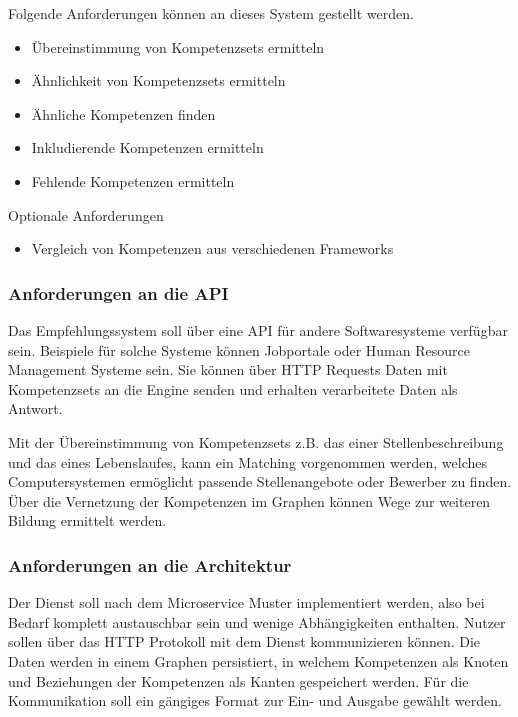 Folgende Anforderungen können an dieses System gestellt werden.
\begin{itemize}
	\item Übereinstimmung von Kompetenzsets ermitteln
	\item Ähnlichkeit von Kompetenzsets ermitteln
	\item Ähnliche Kompetenzen finden
	\item Inkludierende Kompetenzen ermitteln
	\item Fehlende Kompetenzen ermitteln
\end{itemize}

\vspace{1em}

Optionale Anforderungen

\begin{itemize}
	\item Vergleich von Kompetenzen aus verschiedenen Frameworks
\end{itemize}

\subsubsection{Anforderungen an die API}

Das Empfehlungssystem soll über eine API für andere Softwaresysteme verfügbar sein. Beispiele für solche Systeme können Jobportale oder Human Resource Management Systeme sein. Sie können über HTTP Requests Daten mit Kompetenzsets an die Engine senden und erhalten verarbeitete Daten als Antwort.

Mit der Übereinstimmung von Kompetenzsets z.B. das einer Stellenbeschreibung und das eines Lebenslaufes, kann ein Matching vorgenommen werden, welches Computersystemen ermöglicht passende Stellenangebote oder Bewerber zu finden. Über die Vernetzung der Kompetenzen im Graphen können Wege zur weiteren Bildung ermittelt werden.


\subsubsection{Anforderungen an die Architektur}

Der Dienst soll nach dem Microservice Muster implementiert werden, also bei Bedarf komplett austauschbar sein und wenige Abhängigkeiten enthalten. Nutzer sollen über das HTTP Protokoll mit dem Dienst kommunizieren können. Die Daten werden in einem Graphen persistiert, in welchem Kompetenzen als Knoten und Beziehungen der Kompetenzen als Kanten gespeichert werden. Für die Kommunikation soll ein gängiges Format zur Ein- und Ausgabe gewählt werden.

